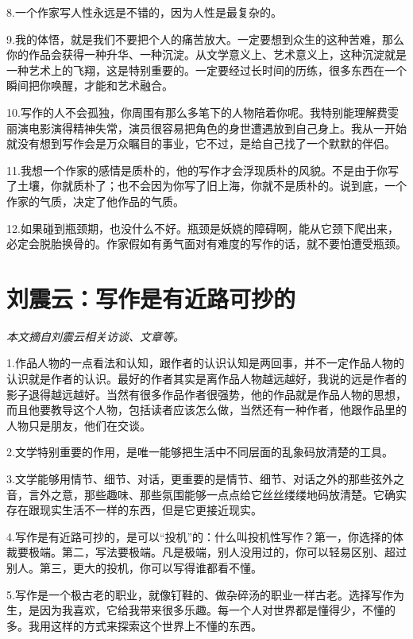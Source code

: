\documentclass[12pt,a5paper]{ctexbook}
\begin{document}
8.一个作家写人性永远是不错的，因为人性是最复杂的。

9.我的体悟，就是我们不要把个人的痛苦放大。一定要想到众生的这种苦难，那么你的作品会获得一种升华、一种沉淀。从文学意义上、艺术意义上，这种沉淀就是一种艺术上的飞翔，这是特别重要的。一定要经过长时间的历练，很多东西在一个瞬间把你唤醒，才能和艺术融合。

10.写作的人不会孤独，你周围有那么多笔下的人物陪着你呢。我特别能理解费雯丽演电影演得精神失常，演员很容易把角色的身世遭遇放到自己身上。我从一开始就没有想到写作会是万众瞩目的事业，它不过，是给自己找了一个默默的伴侣。

11.我想一个作家的感情是质朴的，他的写作才会浮现质朴的风貌。不是由于你写了土壤，你就质朴了；也不会因为你写了旧上海，你就不是质朴的。说到底，一个作家的气质，决定了他作品的气质。

12.如果碰到瓶颈期，也没什么不好。瓶颈是妖娆的障碍啊，能从它颈下爬出来，必定会脱胎换骨的。作家假如有勇气面对有难度的写作的话，就不要怕遭受瓶颈。

\newpage

\section{刘震云：写作是有近路可抄的}

\emph{本文摘自刘震云相关访谈、文章等。}
\vspace{2em}

1.作品人物的一点看法和认知，跟作者的认识认知是两回事，并不一定作品人物的认识就是作者的认识。最好的作者其实是离作品人物越远越好，我说的远是作者的影子退得越远越好。当然有很多作品作者很强势，他的作品就是作品人物的思想，而且他要教导这个人物，包括读者应该怎么做，当然还有一种作者，他跟作品里的人物只是朋友，他们在交谈。

2.文学特别重要的作用，是唯一能够把生活中不同层面的乱象码放清楚的工具。

3.文学能够用情节、细节、对话，更重要的是情节、细节、对话之外的那些弦外之音，言外之意，那些趣味、那些氛围能够一点点给它丝丝缕缕地码放清楚。它确实存在跟现实生活不一样的东西，但是它更接近现实。

4.写作是有近路可抄的，是可以“投机”的：什么叫投机性写作？第一，你选择的体裁要极端。第二，写法要极端。凡是极端，别人没用过的，你可以轻易区别、超过别人。第三，更大的投机，你可以写得谁都看不懂。

5.写作是一个极古老的职业，就像钉鞋的、做杂碎汤的职业一样古老。选择写作为生，是因为我喜欢，它给我带来很多乐趣。每一个人对世界都是懂得少，不懂的多。我用这样的方式来探索这个世界上不懂的东西。
\end{document}
